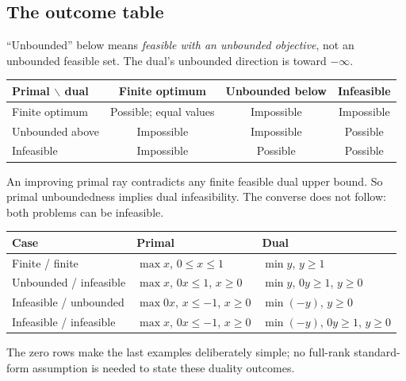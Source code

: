 \documentclass[11pt,a4paper]{article}
\begin{document}
\subsection{The outcome table}\label{sec:outcomes}
``Unbounded'' below means \emph{feasible with an unbounded objective}, not an
unbounded feasible set. The dual's unbounded direction is toward $-\infty$.
\begin{center}
  \begin{tabular}{lccc}\toprule
    Primal $\backslash$ dual & Finite optimum & Unbounded below & Infeasible\\\midrule
    Finite optimum & Possible; equal values & Impossible & Impossible\\
    Unbounded above & Impossible & Impossible & Possible\\
    Infeasible & Impossible & Possible & Possible\\\bottomrule
  \end{tabular}
\end{center}
An improving primal ray contradicts any finite feasible dual upper bound.
So primal unboundedness implies dual infeasibility. The converse does not
follow: both problems can be infeasible.
\begin{center}
  \begin{tabular}{>{\raggedright\arraybackslash}p{3.4cm}>{\raggedright\arraybackslash}p{5.1cm}>{\raggedright\arraybackslash}p{6cm}}\toprule
    Case & Primal & Dual\\\midrule
    Finite / finite & $\max x$, $0\leq x\leq1$ & $\min y$, $y\geq1$\\
    Unbounded / infeasible & $\max x$, $0x\leq1$, $x\geq0$ & $\min y$, $0y\geq1$, $y\geq0$\\
    Infeasible / unbounded & $\max0x$, $x\leq-1$, $x\geq0$ & $\min(-y)$, $y\geq0$\\
    Infeasible / infeasible & $\max x$, $0x\leq-1$, $x\geq0$ & $\min(-y)$, $0y\geq1$, $y\geq0$\\\bottomrule
  \end{tabular}
\end{center}
The zero rows make the last examples deliberately simple; no full-rank
standard-form assumption is needed to state these duality outcomes.
\end{document}
